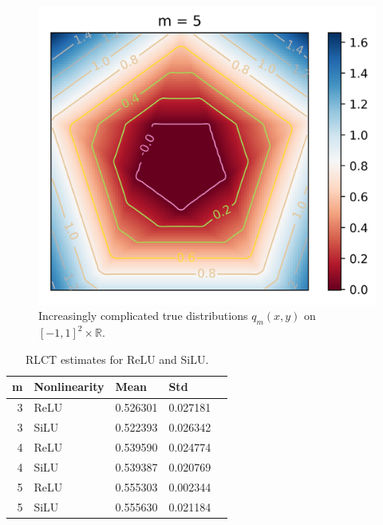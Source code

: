 \documentclass{article} %
\begin{document}
\begin{figure}[h]
\begin{center}
\includegraphics[scale=0.4]{truedist5.png}
\end{center}
\caption{Increasingly complicated true distributions $q_m(x,y)$ on $[-1,1]^2 \times \mathbb{R}$.}
\label{fig:simp_func_complex}
\end{figure}

\begin{table}[h]
    \begin{center}
    \begin{tabular}
    {r l l l l}
    \toprule
      \textbf{m}  & \textbf{Nonlinearity}  & \textbf{Mean} & \textbf{Std}\\ 
    \midrule
    3 & ReLU & 0.526301 & 0.027181\\
    3 & SiLU & 0.522393 & 0.026342\\
    4 & ReLU & 0.539590 & 0.024774\\
    4 & SiLU & 0.539387 & 0.020769\\
    5 & ReLU & 0.555303 & 0.002344\\
    5 & SiLU & 0.555630 & 0.021184\\
   \bottomrule
   \end{tabular}
    \end{center}
    \caption{\footnotesize RLCT estimates for ReLU and SiLU.}
    \label{table:hyper}
\end{table}
\end{document}
